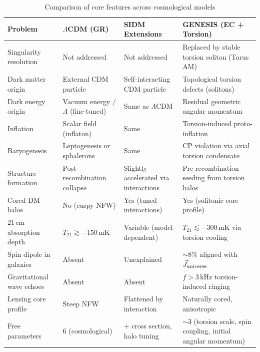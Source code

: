 \documentclass{article}
\begin{document}
\begin{table}[h!]
\centering
\caption{Comparison of core features across cosmological models}
\renewcommand{\arraystretch}{1.4}
\begin{tabular}{|p{3.6cm}|p{4.2cm}|p{4.2cm}|p{4.8cm}|}
\hline
\textbf{Problem} & \textbf{$\Lambda$CDM (GR)} & \textbf{SIDM Extensions} & \textbf{GENESIS (EC + Torsion)} \\
\hline
Singularity resolution & Not addressed & Not addressed & Replaced by stable torsion soliton (Torus AM) \\
\hline
Dark matter origin & External CDM particle & Self-interacting CDM particle & Topological torsion defects (solitons) \\
\hline
Dark energy origin & Vacuum energy / $\Lambda$ (fine-tuned) & Same as $\Lambda$CDM & Residual geometric angular momentum \\
\hline
Inflation & Scalar field (inflaton) & Same & Torsion-induced proto-inflation \\
\hline
Baryogenesis & Leptogenesis or sphalerons & Same & CP violation via axial torsion condensate \\
\hline
Structure formation & Post-recombination collapse & Slightly accelerated via interactions & Pre-recombination seeding from torsion halos \\
\hline
Cored DM halos & No (cuspy NFW) & Yes (tuned interactions) & Yes (solitonic core profile) \\
\hline
21\,cm absorption depth & $T_{21} \gtrsim -150$\,mK & Variable (model-dependent) & $T_{21} \lesssim -300$\,mK via torsion cooling \\
\hline
Spin dipole in galaxies & Absent & Unexplained & $\sim$8\% aligned with $\vec{J}_{\rm universe}$ \\
\hline
Gravitational wave echoes & Absent & Absent & $f > 3$\,kHz torsion-induced ringing \\
\hline
Lensing core profile & Steep NFW & Flattened by interaction & Naturally cored, anisotropic \\
\hline
Free parameters & 6 (cosmological) & $+$ cross section, halo tuning & $\sim$3 (torsion scale, spin coupling, initial angular momentum) \\
\hline
\end{tabular}
\label{tab:model_comparison}
\end{table}
\end{document}
